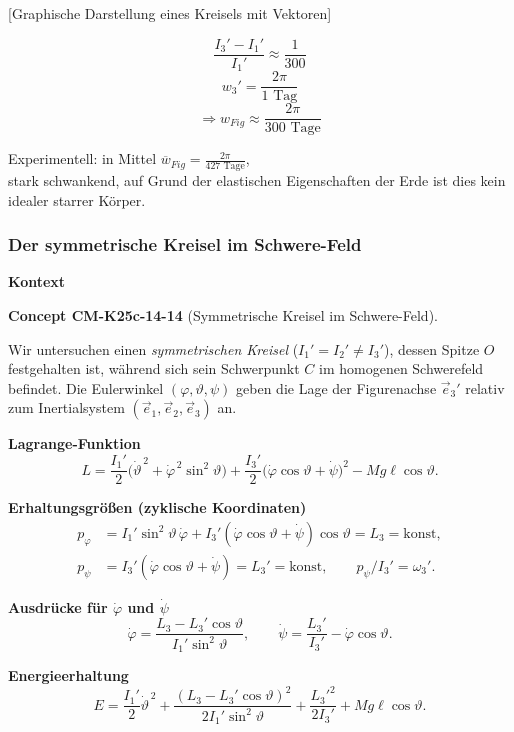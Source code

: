 \documentclass[10pt, letterpaper]{article}
\newcommand{\CustomHeading}[3]{%
  \par\medskip\noindent%
  \textbf{#1 #2} \textnormal{(#3)}.\enskip%
}
\newenvironment{CONC}[2]{\begin{unitbox}\CustomHeading{Concept}{#1}{#2}}{\end{unitbox}}
\begin{document}
[Graphische Darstellung eines Kreisels mit Vektoren]

\[\frac{I_3'-I_1'}{I_1'} \approx \frac{1}{300}\]
\[w_3' = \frac{2\pi}{1\text{ Tag}}\]
\[\Rightarrow w_{Fig} \approx \frac{2\pi}{300\text{ Tage}}\]

Experimentell: in Mittel $\overline{w}_{Fig} = \frac{2\pi}{427\text{ Tage}}$,\\
stark schwankend, auf Grund der elastischen Eigenschaften der Erde ist dies kein idealer starrer Körper.







\pagebreak

\subsubsection{Der symmetrische Kreisel im Schwere-Feld}



\textbf{Kontext}\\
\begin{CONC}{CM-K25c-14-14}{Symmetrische Kreisel im Schwere-Feld}
Wir untersuchen einen \emph{symmetrischen Kreisel} ($I_1'=I_2'\neq I_3'$), dessen Spitze $O$ festgehalten ist, während sich sein Schwerpunkt $C$ im homogenen Schwerefeld befindet. Die Euler­winkel $(\varphi,\vartheta,\psi)$ geben die Lage der Figurenachse $\vec e_3'$ relativ zum Inertialsystem $(\vec e_1,\vec e_2,\vec e_3)$ an.  

\textbf{Lagrange-Funktion}\\
\[
L = \frac{I_1'}{2}\bigl(\dot\vartheta^{\,2}+\dot\varphi^{\,2}\sin^{2}\vartheta\bigr)
    +\frac{I_3'}{2}\bigl(\dot\varphi\cos\vartheta+\dot\psi\bigr)^{2}
    -Mg\ell\cos\vartheta .
\]

\textbf{Erhaltungsgrößen (zyklische Koordinaten)}  
\[
\begin{aligned}
p_\varphi &= I_1'\sin^{2}\vartheta\,\dot\varphi
           +I_3'(\dot\varphi\cos\vartheta+\dot\psi)\cos\vartheta
           =L_3=\text{konst},\\[4pt]
p_\psi    &= I_3'(\dot\varphi\cos\vartheta+\dot\psi)
           =L_3'=\text{konst},\qquad
p_\psi/I_3'=\omega_3'.
\end{aligned}
\]

\textbf{Ausdrücke für $\dot\varphi$ und $\dot\psi$}  
\[
\dot\varphi = \frac{L_3-L_3'\cos\vartheta}{I_1'\sin^{2}\vartheta},
\qquad
\dot\psi    = \frac{L_3'}{I_3'}
             -\dot\varphi\cos\vartheta .
\]

\textbf{Energieerhaltung}\\
\[
E = \frac{I_1'}{2}\dot\vartheta^{\,2}
    +\frac{(L_3-L_3'\cos\vartheta)^{2}}{2I_1'\sin^{2}\vartheta}
    +\frac{L_3'^{2}}{2I_3'}
    +Mg\ell\cos\vartheta .
\tag{3}
\]
\end{CONC}
\end{document}
